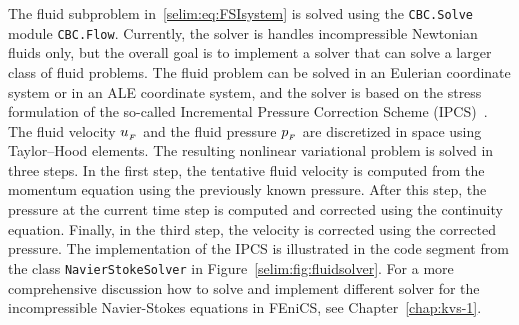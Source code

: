 The fluid subproblem in~\eqref{selim:eq:FSIsystem} is solved using the
\texttt{CBC.Solve} module \texttt{CBC.Flow}. Currently, the solver is
handles incompressible Newtonian fluids only, but the overall
goal is to implement a solver that can solve a larger class of fluid
problems.  The fluid problem can be solved in an Eulerian coordinate
system or in an ALE coordinate system, and the solver is
based on the stress formulation of the so-called Incremental
Pressure Correction Scheme (IPCS)~\cite{Goda197976}. The fluid
velocity $u_{_{F}}$ and the fluid pressure $p_{_{F}}$ are discretized in
space using Taylor--Hood elements. The resulting nonlinear variational
problem is solved in three steps. In the first step, the tentative
fluid velocity is computed from the momentum equation using the
previously known pressure. After this step, the pressure at the
current time step is computed and corrected using the continuity
equation. Finally, in the third step, the velocity is corrected using the
corrected pressure.  The implementation of the IPCS is illustrated in
the code segment from the class \texttt{NavierStokeSolver} in
Figure~\ref{selim:fig:fluidsolver}. For a more comprehensive discussion
how to solve and implement different solver for the incompressible
Navier-Stokes equations in FEniCS, see Chapter~\ref{chap:kvs-1}.

